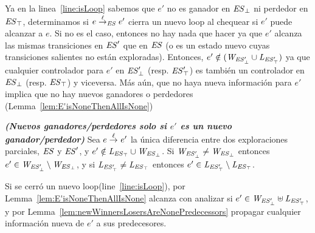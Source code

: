 Ya en la linea~\ref{line:isLoop} sabemos que $e'$ no es ganador en $\mathit{\mathit{ES}_{\bot}}$ ni perdedor en $\mathit{\mathit{ES}_{\top}}$, determinamos si $e 
\overset{\ell}{\rightarrow}_{\mathit{ES}} e'$ cierra un nuevo loop al chequear si $e'$ puede alcanzar a $e$. Si no es el caso, entonces no hay nada que hacer ya que $e'$ alcanza las mismas transiciones en $\mathit{ES}'$ que en $\mathit{ES}$ (o es un estado nuevo cuyas transiciones salientes no están exploradas). Entonces, $e' \notin 
(\mathit{W_{\mathit{\mathit{ES}'_{\bot}}}} \cup \mathit{L_{\mathit{\mathit{ES}'_{\top}}}})$ ya que cualquier controlador para $e'$ en $\mathit{\mathit{ES}'_{\bot}}$ (resp. $\mathit{\mathit{ES}'_{\top}}$) es también un controlador en $\mathit{\mathit{ES}_{\bot}}$ (resp. 
$\mathit{\mathit{ES}_{\top}}$) y viceversa.
%
%
Más aún, que no haya nueva información para $e'$ implica que no hay nuevos ganadores o perdedores (Lemma~\ref{lem:E'isNoneThenAllIsNone})

\begin{lemma}\textbf{\emph{(Nuevos ganadores/perdedores solo si $e'$ es un nuevo ganador/perdedor)}}
\label{lem:E'isNoneThenAllIsNone}
Sea $e \overset{\ell}{\rightarrow}_{} e'$ la única diferencia entre dos exploraciones parciales, $\mathit{ES}$ y $\mathit{ES}'$, y $e' \notin \mathit{L_{\mathit{\mathit{ES}_{\top}}}} \cup \mathit{W_{\mathit{\mathit{ES}_{\bot}}}}$. Si $\mathit{W_{\mathit{\mathit{ES}'_{\bot}}}} \neq \mathit{W_{\mathit{\mathit{ES}_{\bot}}}}$ entonces $e' \in \mathit{W_{\mathit{\mathit{ES}'_{\bot}}}} \setminus \mathit{W_{\mathit{\mathit{ES}_{\bot}}}}$, y si $\mathit{L_{\mathit{\mathit{ES}'_{\top}}}} \neq \mathit{L_{\mathit{\mathit{ES}_{\top}}}} $ entonces $e' \in \mathit{L_{\mathit{\mathit{ES}'_{\top}}}} \setminus \mathit{L_{\mathit{\mathit{ES}_{\top}}}}$.
\end{lemma}


Si se cerró un nuevo loop(line~\ref{line:isLoop}), por Lemma~\ref{lem:E'isNoneThenAllIsNone} alcanza con analizar si $e' 
\in \mathit{W_{\mathit{\mathit{ES}'_{\bot}}}} \uplus \mathit{L_{\mathit{\mathit{ES}'_{\top}}}}$, y por Lemma~\ref{lem:newWinnersLosersAreNonePredecessors} propagar cualquier información nueva de $e'$ a sus predecesores. 

